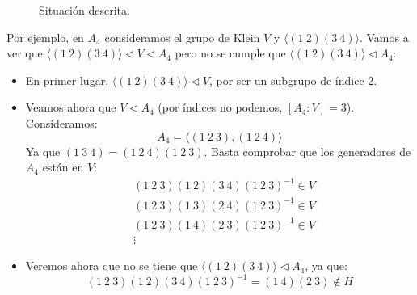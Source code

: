 \begin{ejemplo}
\begin{enumerate}
\begin{figure}[H]
                \caption{Situación descrita.}
                \label{fig:situacion}
            \end{figure}

            Por ejemplo, en $A_4$ consideramos el grupo de Klein $V$ y $\langle (1\ 2)(3\ 4) \rangle $. Vamos a ver que $\langle (1\ 2)(3\ 4) \rangle \lhd V \lhd A_4 $ pero no se cumple que $\langle (1\ 2)(3\ 4) \rangle \lhd A_4 $:
            \begin{figure}[H]
                \centering
            \end{figure}
            \begin{itemize}
                \item En primer lugar, $\langle (1\ 2)(3\ 4) \rangle \lhd V $, por ser un subgrupo de índice 2.
                \item Veamos ahora que $V\lhd A_4$ (por índices no podemos, $[A_4:V] = 3$). Consideramos:
                    \begin{equation*}
                        A_4 = \langle (1\ 2\ 3), (1\ 2\ 4) \rangle 
                    \end{equation*}
                    Ya que $(1\ 3\ 4) = (1\ 2\ 4)(1\ 2\ 3)$. Basta comprobar que los generadores de $A_4$ están en $V$: %
                    \begin{align*}
                        &(1\ 2\ 3)(1\ 2)(3\ 4){(1\ 2\ 3)}^{-1} \in  V \\
                        &(1\ 2\ 3)(1\ 3)(2\ 4){(1\ 2\ 3)}^{-1} \in  V \\
                        &(1\ 2\ 3)(1\ 4)(2\ 3){(1\ 2\ 3)}^{-1} \in  V \\
                        &\vdots
                    \end{align*}
                \item Veremos ahora que no se tiene que $\langle (1\ 2)(3\ 4) \rangle\lhd A_4 $, ya que:
                    \begin{equation*}
                        (1\ 2\ 3)(1\ 2)(3\ 4){(1\ 2\ 3)}^{-1} = (1\ 4)(2\ 3)\notin H
                    \end{equation*}
            \end{itemize}
    \end{enumerate}
\end{ejemplo}

